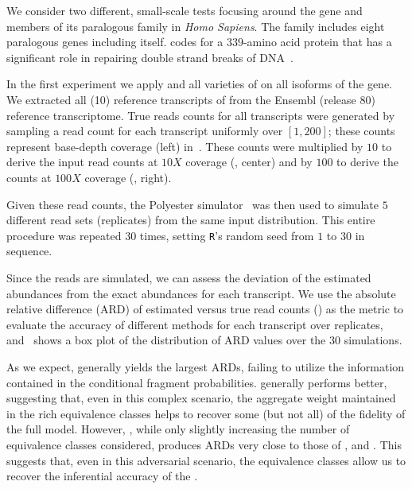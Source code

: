 We consider two different, small-scale tests focusing around the gene
 and members of its paralogous family in \emph{Homo Sapiens}. 
The  family includes eight paralogous genes including
 itself.  codes for a $339$-amino acid protein that has
a significant role in repairing double strand breaks of DNA~\citep{yates2015ensembl}.

In the first experiment we apply \rsem and all varieties of \salmon on all
isoforms of the  gene. We extracted all (10) reference transcripts of
 from the Ensembl (release 80) reference transcriptome. True reads
counts for all transcripts were generated by sampling a read count for each
transcript uniformly over $\left[1,200\right]$; these counts represent base-depth
coverage (left) in~.  These counts were multiplied by $10$ to
derive the input read counts at $10X$ coverage (, center) and
by $100$ to derive the counts at $100X$ coverage (, right).

Given these read counts, the Polyester simulator~\citep{frazee2015polyester} was
then used to simulate $5$ different read sets (replicates) from the same input
distribution. This entire procedure was repeated $30$ times, setting 
\texttt{R}'s random seed from $1$ to $30$ in sequence.

Since the reads are simulated, we can assess the deviation of the estimated
abundances from the exact abundances for each transcript. We use the absolute 
relative difference (ARD) of estimated versus true read counts
() as the metric to evaluate the accuracy of different methods for
each transcript over replicates, and~ shows a box plot of the
distribution of ARD values over the $30$ simulations.

As we expect, \salmonu generally yields the largest ARDs, failing to utilize the
information contained in the conditional fragment probabilities. \salmon
generally performs better, suggesting that, even in this complex scenario, the
aggregate weight maintained in the rich equivalence classes helps to recover
some (but not all) of the fidelity of the full model. However, \salmonrf, while
only slightly increasing the number of equivalence classes considered, produces
ARDs very close to those of \rsem, \expressEM and \salmonfm. This suggests that, even in
this adversarial scenario, the \rangebased equivalence classes allow us to
recover the inferential accuracy of the \fm.

